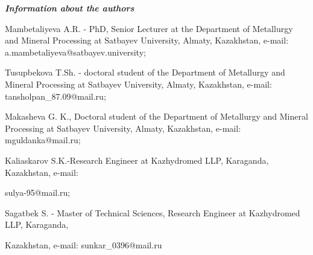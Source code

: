 \emph{{\bfseries Information about the authors}}

\begin{noparindent}
Mambetaliyeva A.R. - PhD, Senior Lecturer at the Department of
Metallurgy and Mineral Processing at Satbayev University, Almaty,
Kazakhstan, e-mail: a.mambetaliyeva@satbayev.university;

Tusupbekova T.Sh. - doctoral student of the Department of Metallurgy and
Mineral Processing at Satbayev University, Almaty, Kazakhstan, e-mail:
tansholpan\_87.09@mail.ru;

Makasheva G. K., Doctoral student of the Department of Metallurgy and
Mineral Processing at Satbayev University, Almaty, Kazakhstan, e-mail:
mguldanka@mail.ru;

Kaliaskarov S.K.-Research Engineer at Kazhydromed LLP, Karaganda,
Kazakhstan, e-mail:

sulya-95@mail.ru;

Sagatbek S. - Master of Technical Sciences, Research Engineer at
Kazhydromed LLP, Karaganda,

Kazakhstan, e-mail: sunkar\_0396@mail.ru
\end{noparindent}
